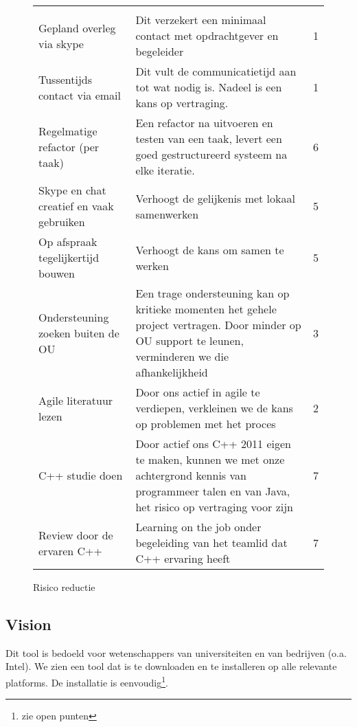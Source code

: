 \begin{figure}[!ht]
\begin{center}
\small
\begin{tabular}{p{10em}p{20em}c}
    {\bf } & {\bf } & {\bf } \\
    Gepland overleg via skype & Dit verzekert een minimaal contact met opdrachtgever en begeleider & 1\\
    Tussentijds contact via email & Dit vult de communicatietijd aan tot wat nodig is. Nadeel is
				    een kans op vertraging. & 1\\
    Regelmatige refactor (per taak) & Een refactor na uitvoeren en testen van een taak, levert
					een goed gestructureerd systeem na elke iteratie. & 6\\
    Skype en chat creatief en vaak gebruiken & Verhoogt de gelijkenis met lokaal samenwerken & 5\\
    Op afspraak tegelijkertijd bouwen & Verhoogt de kans om samen te werken & 5\\
    Ondersteuning zoeken buiten de OU & Een trage ondersteuning kan op kritieke momenten
					het gehele project vertragen. Door minder op
					OU support te leunen, verminderen we die afhankelijkheid & 3\\
    Agile literatuur lezen & Door ons actief in agile te verdiepen, verkleinen we de kans op
				problemen met het proces & 2\\
    C++ studie doen & Door actief ons C++ 2011 eigen te maken, kunnen we
			met onze achtergrond kennis van programmeer talen en
			van Java, het risico op vertraging voor zijn & 7\\
    Review door de ervaren C++ & Learning on the job onder begeleiding van
				het teamlid dat C++ ervaring heeft & 7\\
\end{tabular}
\end{center}
 \caption{Risico reductie}\label{fig: risico reductie}
\end{figure}


\subsection{Vision}\label{sec: vision}

Dit tool is bedoeld voor wetenschappers van universiteiten en van bedrijven (o.a. Intel). We zien een tool dat
is te downloaden en te installeren op alle relevante platforms. De installatie is eenvoudig\footnote{zie open punten}.

